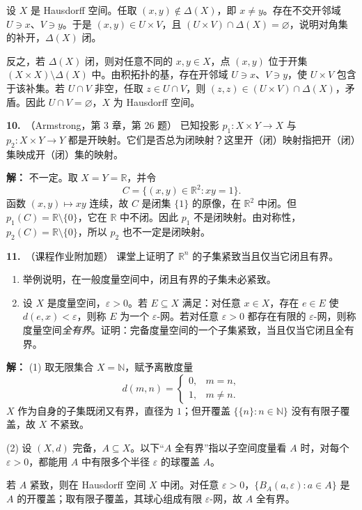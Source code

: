 \documentclass{article}
\newcommand{\R}{\mathbb R}
\newcommand{\problem}[2]{\par\medskip\noindent\textbf{#1.}\ （#2）\quad}
\begin{document}
设 $X$ 是 Hausdorff 空间。任取 $(x,y)\notin\Delta(X)$，即 $x\ne y$。存在不交开邻域 $U\ni x$、$V\ni y$。于是 $(x,y)\in U\times V$，且 $(U\times V)\cap\Delta(X)=\varnothing$，说明对角集的补开，$\Delta(X)$ 闭。

反之，若 $\Delta(X)$ 闭，则对任意不同的 $x,y\in X$，点 $(x,y)$ 位于开集 $(X\times X)\setminus\Delta(X)$ 中。由积拓扑的基，存在开邻域 $U\ni x$、$V\ni y$，使 $U\times V$ 包含于该补集。若 $U\cap V$ 非空，任取 $z\in U\cap V$，则 $(z,z)\in(U\times V)\cap\Delta(X)$，矛盾。因此 $U\cap V=\varnothing$，$X$ 为 Hausdorff 空间。

\problem{10}{Armstrong，第 3 章，第 26 题}
已知投影 $p_1:X\times Y\to X$ 与 $p_2:X\times Y\to Y$ 都是开映射。它们是否总为闭映射？这里开（闭）映射指把开（闭）集映成开（闭）集的映射。
\par\noindent\textbf{解：}
不一定。取 $X=Y=\R$，并令
\[
C=\{(x,y)\in\R^2:xy=1\}.
\]
函数 $(x,y)\mapsto xy$ 连续，故 $C$ 是闭集 $\{1\}$ 的原像，在 $\R^2$ 中闭。但 $p_1(C)=\R\setminus\{0\}$，它在 $\R$ 中不闭。因此 $p_1$ 不是闭映射。由对称性，$p_2(C)=\R\setminus\{0\}$，所以 $p_2$ 也不一定是闭映射。

\problem{11}{课程作业附加题}
课堂上证明了 $\R^n$ 的子集紧致当且仅当它闭且有界。
\begin{enumerate}
\item 举例说明，在一般度量空间中，闭且有界的子集未必紧致。
\item 设 $X$ 是度量空间，$\varepsilon>0$。若 $E\subseteq X$ 满足：对任意 $x\in X$，存在 $e\in E$ 使 $d(e,x)<\varepsilon$，则称 $E$ 为一个 $\varepsilon$-网。若对任意 $\varepsilon>0$ 都存在有限的 $\varepsilon$-网，则称度量空间\emph{全有界}。证明：完备度量空间的一个子集紧致，当且仅当它闭且全有界。
\end{enumerate}
\par\noindent\textbf{解：}
(1) 取无限集合 $X=\mathbb N$，赋予离散度量
\[
d(m,n)=
\begin{cases}0,&m=n,\\1,&m\ne n.\end{cases}
\]
$X$ 作为自身的子集既闭又有界，直径为 $1$；但开覆盖 $\{\{n\}:n\in\mathbb N\}$ 没有有限子覆盖，故 $X$ 不紧致。

(2) 设 $(X,d)$ 完备，$A\subseteq X$。以下“$A$ 全有界”指以子空间度量看 $A$ 时，对每个 $\varepsilon>0$，都能用 $A$ 中有限多个半径 $\varepsilon$ 的球覆盖 $A$。

若 $A$ 紧致，则在 Hausdorff 空间 $X$ 中闭。对任意 $\varepsilon>0$，$\{B_A(a,\varepsilon):a\in A\}$ 是 $A$ 的开覆盖；取有限子覆盖，其球心组成有限 $\varepsilon$-网，故 $A$ 全有界。
\end{document}
